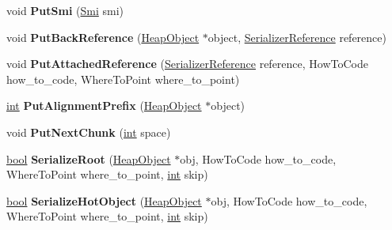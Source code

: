 \begin{DoxyCompactItemize}
\mbox{\label{classv8_1_1internal_1_1Serializer_a19e9b99831f3b25b6293c9ba534638f6}} 
void {\bfseries Put\+Smi} (\mbox{\hyperlink{classv8_1_1internal_1_1Smi}{Smi}} smi)
\item 
\mbox{\label{classv8_1_1internal_1_1Serializer_ae682c77924def2a0761c797817ef022f}} 
void {\bfseries Put\+Back\+Reference} (\mbox{\hyperlink{classv8_1_1internal_1_1HeapObject}{Heap\+Object}} $\ast$object, \mbox{\hyperlink{classv8_1_1internal_1_1SerializerReference}{Serializer\+Reference}} reference)
\item 
\mbox{\label{classv8_1_1internal_1_1Serializer_ab00b15d580f86950196f870c5eff7dc8}} 
void {\bfseries Put\+Attached\+Reference} (\mbox{\hyperlink{classv8_1_1internal_1_1SerializerReference}{Serializer\+Reference}} reference, How\+To\+Code how\+\_\+to\+\_\+code, Where\+To\+Point where\+\_\+to\+\_\+point)
\item 
\mbox{\label{classv8_1_1internal_1_1Serializer_ab2d4d6dc19c242d9e0ea92aaa0ac55df}} 
\mbox{\hyperlink{classint}{int}} {\bfseries Put\+Alignment\+Prefix} (\mbox{\hyperlink{classv8_1_1internal_1_1HeapObject}{Heap\+Object}} $\ast$object)
\item 
\mbox{\label{classv8_1_1internal_1_1Serializer_a3e56f661db8d5786586a3eaa09f4e1f4}} 
void {\bfseries Put\+Next\+Chunk} (\mbox{\hyperlink{classint}{int}} space)
\item 
\mbox{\label{classv8_1_1internal_1_1Serializer_a9b8ed25b56817e9c859ae0c20048b998}} 
\mbox{\hyperlink{classbool}{bool}} {\bfseries Serialize\+Root} (\mbox{\hyperlink{classv8_1_1internal_1_1HeapObject}{Heap\+Object}} $\ast$obj, How\+To\+Code how\+\_\+to\+\_\+code, Where\+To\+Point where\+\_\+to\+\_\+point, \mbox{\hyperlink{classint}{int}} skip)
\item 
\mbox{\label{classv8_1_1internal_1_1Serializer_a5c4ab48ff2b4fb6dc85e250f57121969}} 
\mbox{\hyperlink{classbool}{bool}} {\bfseries Serialize\+Hot\+Object} (\mbox{\hyperlink{classv8_1_1internal_1_1HeapObject}{Heap\+Object}} $\ast$obj, How\+To\+Code how\+\_\+to\+\_\+code, Where\+To\+Point where\+\_\+to\+\_\+point, \mbox{\hyperlink{classint}{int}} skip)

\end{DoxyCompactItemize}
